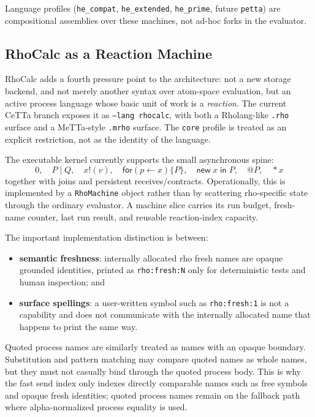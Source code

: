 \documentclass[11pt]{article}
\newcommand{\code}[1]{\texttt{#1}}
\newcommand{\CeTTa}{\textup{CeTTa}}
\newcommand{\RhoCalc}{\textup{RhoCalc}}
\begin{document}
Language profiles (\code{he\_compat}, \code{he\_extended},
\code{he\_prime}, future \code{petta}) are compositional assemblies
over these machines, not ad-hoc forks in the evaluator.

\subsection{\RhoCalc{} as a Reaction Machine}

\RhoCalc{} adds a fourth pressure point to the architecture: not a new storage
backend, and not merely another syntax over atom-space evaluation, but an
active process language whose basic unit of work is a \emph{reaction}.  The
current \CeTTa{} branch exposes it as \code{--lang rhocalc}, with both a
Rholang-like \code{.rho} surface and a MeTTa-style \code{.mrho} surface.  The
\code{core} profile is treated as an explicit restriction, not as the identity
of the language.

The executable kernel currently supports the small asynchronous spine:
\[
  0,\quad P \mid Q,\quad x!(v),\quad
  \mathsf{for}(p \leftarrow x)\{P\},\quad
  \mathsf{new}\;x\;\mathsf{in}\;P,\quad
  @P,\quad *x
\]
together with joins and persistent receives/contracts.  Operationally, this is
implemented by a \code{RhoMachine} object rather than by scattering rho-specific
state through the ordinary evaluator.  A machine slice carries its run budget,
fresh-name counter, last run result, and reusable reaction-index capacity.

The important implementation distinction is between:
\begin{itemize}
\item \textbf{semantic freshness}: internally allocated rho fresh names are
  opaque grounded identities, printed as \code{rho:fresh:N} only for
  deterministic tests and human inspection; and
\item \textbf{surface spellings}: a user-written symbol such as
  \code{rho:fresh:1} is not a capability and does not communicate with the
  internally allocated name that happens to print the same way.
\end{itemize}

Quoted process names are similarly treated as names with an opaque boundary.
Substitution and pattern matching may compare quoted names as whole names, but
they must not casually bind through the quoted process body.  This is why the
fast send index only indexes directly comparable names such as free symbols and
opaque fresh identities; quoted process names remain on the fallback path where
alpha-normalized process equality is used.
\end{document}
